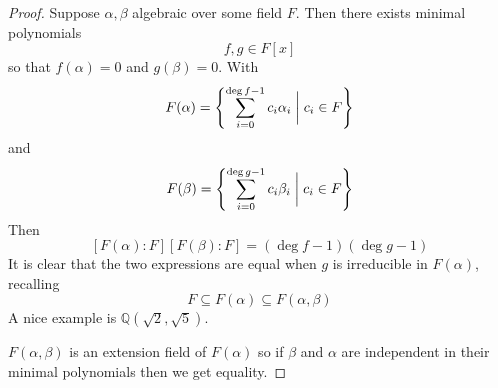 \begin{proof}
    Suppose $\alpha,\beta$ algebraic over some field $F$.
    Then there exists minimal polynomials 
    \[
        f,g \in F[x]
    \]
    so that $f(\alpha) = 0$ and $g(\beta) = 0$. 
    With 
    \[
        F(\alpha) = 
        \left\{
        \displaystyle\sum_{i=0}^{\deg f - 1}c_i\alpha_i \biggm|
        c_i \in F
        \right\}
    \]
    and 
    \[
        F(\beta) = 
        \left\{
        \displaystyle\sum_{i=0}^{\deg g - 1}c_i\beta_i \biggm|
        c_i \in F
        \right\}
    \]
    Then 
    \[
        [F(\alpha):F][F(\beta):F] = (\deg f-1)(\deg g-1)
    \]
    It is clear that the two expressions are equal when 
    $g$ is irreducible in $F(\alpha)$, recalling 
    \[
        F \subseteq F(\alpha) \subseteq F(\alpha,\beta)
    \]
    A nice example is $\mathbb Q(\sqrt 2, \sqrt 5)$.

    $F(\alpha,\beta)$ is an extension field of $F(\alpha)$ so if 
    $\beta$ and $\alpha$ are independent in their minimal polynomials 
    then we get equality. 
\end{proof}


